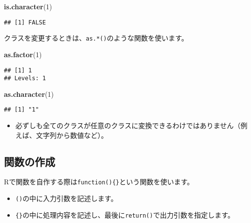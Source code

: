 \documentclass[]{bxjsarticle}
\newenvironment{Shaded}{\begin{snugshade}}{\end{snugshade}}
\newcommand{\DecValTok}[1]{\textcolor[rgb]{0.00,0.00,0.81}{#1}}
\newcommand{\KeywordTok}[1]{\textcolor[rgb]{0.13,0.29,0.53}{\textbf{#1}}}
\newcommand{\NormalTok}[1]{#1}
\providecommand{\tightlist}{%
  \setlength{\itemsep}{0pt}\setlength{\parskip}{0pt}}
\begin{document}
\begin{Shaded}
\begin{Highlighting}[]
\KeywordTok{is.character}\NormalTok{(}\DecValTok{1}\NormalTok{)}
\end{Highlighting}
\end{Shaded}

\begin{verbatim}
## [1] FALSE
\end{verbatim}

クラスを変更するときは、\texttt{as.*()}のような関数を使います。

\begin{Shaded}
\begin{Highlighting}[]
\KeywordTok{as.factor}\NormalTok{(}\DecValTok{1}\NormalTok{)}
\end{Highlighting}
\end{Shaded}

\begin{verbatim}
## [1] 1
## Levels: 1
\end{verbatim}

\begin{Shaded}
\begin{Highlighting}[]
\KeywordTok{as.character}\NormalTok{(}\DecValTok{1}\NormalTok{)}
\end{Highlighting}
\end{Shaded}

\begin{verbatim}
## [1] "1"
\end{verbatim}

\begin{itemize}
\tightlist
\item
  必ずしも全てのクラスが任意のクラスに変換できるわけではありません（例えば、文字列から数値など）。
\end{itemize}

\hypertarget{ux95a2ux6570ux306eux4f5cux6210}{%
\subsection{関数の作成}\label{ux95a2ux6570ux306eux4f5cux6210}}

Rで関数を自作する際は\texttt{function()\{\}}という関数を使います。

\begin{itemize}
\tightlist
\item
  \texttt{()}の中に入力引数を記述します。
\item
  \texttt{\{\}}の中に処理内容を記述し、最後に\texttt{return()}で出力引数を指定します。
\end{itemize}
\end{document}
